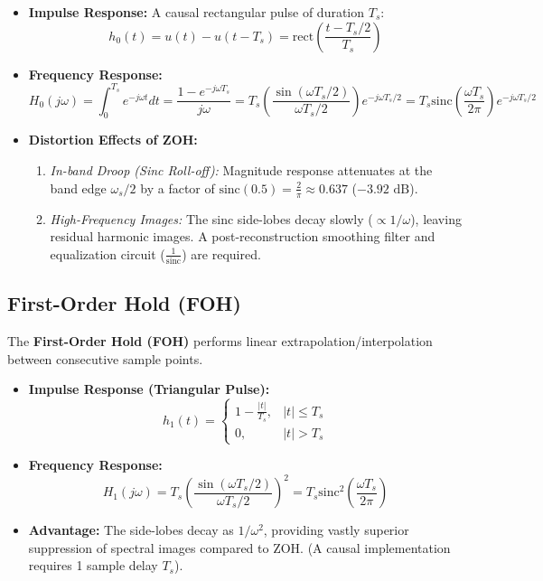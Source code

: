 \documentclass[12pt,a4paper]{article}
\begin{document}
\begin{itemize}[topsep=2pt, itemsep=2pt]
  \item \textbf{Impulse Response:} A causal rectangular pulse of duration $T_s$:
  \begin{equation}
    h_0(t) = u(t) - u(t - T_s) = \text{rect}\left(\frac{t - T_s/2}{T_s}\right)
  \end{equation}
  \item \textbf{Frequency Response:}
  \begin{equation}
    H_0(j\omega) = \int_0^{T_s} e^{-j\omega t} dt = \frac{1 - e^{-j\omega T_s}}{j\omega} = T_s \left( \frac{\sin(\omega T_s / 2)}{\omega T_s / 2} \right) e^{-j\omega T_s / 2} = T_s \text{sinc}\left(\frac{\omega T_s}{2\pi}\right) e^{-j\omega T_s / 2}
  \end{equation}
  \item \textbf{Distortion Effects of ZOH:}
  \begin{enumerate}[topsep=2pt, itemsep=2pt]
    \item \textit{In-band Droop (Sinc Roll-off):} Magnitude response attenuates at the band edge $\omega_s/2$ by a factor of $\text{sinc}(0.5) = \frac{2}{\pi} \approx 0.637$ ($-3.92\text{ dB}$).
    \item \textit{High-Frequency Images:} The sinc side-lobes decay slowly ($\propto 1/\omega$), leaving residual harmonic images. A post-reconstruction smoothing filter and equalization circuit ($\frac{1}{\text{sinc}}$) are required.
  \end{enumerate}
\end{itemize}

\subsection{First-Order Hold (FOH)}
The \textbf{First-Order Hold (FOH)} performs linear extrapolation/interpolation between consecutive sample points.
\begin{itemize}[topsep=2pt, itemsep=2pt]
  \item \textbf{Impulse Response (Triangular Pulse):}
  \begin{equation}
    h_1(t) = \begin{cases} 1 - \frac{|t|}{T_s}, & |t| \le T_s \\ 0, & |t| > T_s \end{cases}
  \end{equation}
  \item \textbf{Frequency Response:}
  \begin{equation}
    H_1(j\omega) = T_s \left( \frac{\sin(\omega T_s / 2)}{\omega T_s / 2} \right)^2 = T_s \text{sinc}^2\left(\frac{\omega T_s}{2\pi}\right)
  \end{equation}
  \item \textbf{Advantage:} The side-lobes decay as $1/\omega^2$, providing vastly superior suppression of spectral images compared to ZOH. (A causal implementation requires 1 sample delay $T_s$).
\end{itemize}
\end{document}
